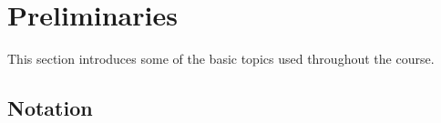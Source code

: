 \section{Preliminaries}

This section introduces some of the basic topics used throughout the course.

\subsection{Notation}
